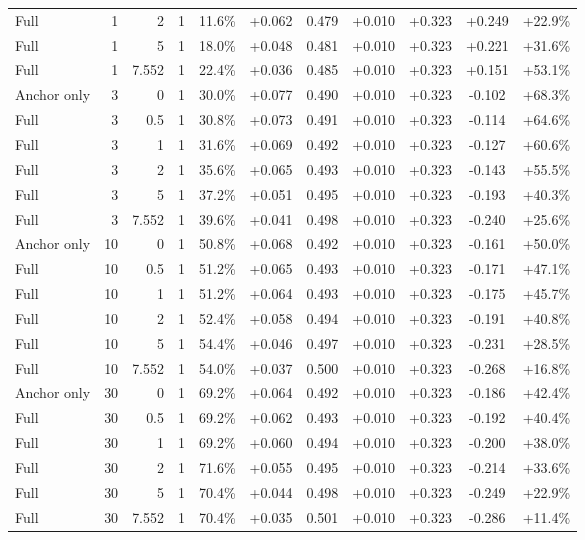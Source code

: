 \begin{table}[htbp]
\begin{tabular}{lrrrccccccc}
Full & 1 & 2 & 1 & 11.6\% & +0.062 & 0.479 & +0.010 & +0.323 & +0.249 & +22.9\% \\
Full & 1 & 5 & 1 & 18.0\% & +0.048 & 0.481 & +0.010 & +0.323 & +0.221 & +31.6\% \\
Full & 1 & 7.552 & 1 & 22.4\% & +0.036 & 0.485 & +0.010 & +0.323 & +0.151 & +53.1\% \\
Anchor only & 3 & 0 & 1 & 30.0\% & +0.077 & 0.490 & +0.010 & +0.323 & -0.102 & +68.3\% \\
Full & 3 & 0.5 & 1 & 30.8\% & +0.073 & 0.491 & +0.010 & +0.323 & -0.114 & +64.6\% \\
Full & 3 & 1 & 1 & 31.6\% & +0.069 & 0.492 & +0.010 & +0.323 & -0.127 & +60.6\% \\
Full & 3 & 2 & 1 & 35.6\% & +0.065 & 0.493 & +0.010 & +0.323 & -0.143 & +55.5\% \\
Full & 3 & 5 & 1 & 37.2\% & +0.051 & 0.495 & +0.010 & +0.323 & -0.193 & +40.3\% \\
Full & 3 & 7.552 & 1 & 39.6\% & +0.041 & 0.498 & +0.010 & +0.323 & -0.240 & +25.6\% \\
Anchor only & 10 & 0 & 1 & 50.8\% & +0.068 & 0.492 & +0.010 & +0.323 & -0.161 & +50.0\% \\
Full & 10 & 0.5 & 1 & 51.2\% & +0.065 & 0.493 & +0.010 & +0.323 & -0.171 & +47.1\% \\
Full & 10 & 1 & 1 & 51.2\% & +0.064 & 0.493 & +0.010 & +0.323 & -0.175 & +45.7\% \\
Full & 10 & 2 & 1 & 52.4\% & +0.058 & 0.494 & +0.010 & +0.323 & -0.191 & +40.8\% \\
Full & 10 & 5 & 1 & 54.4\% & +0.046 & 0.497 & +0.010 & +0.323 & -0.231 & +28.5\% \\
Full & 10 & 7.552 & 1 & 54.0\% & +0.037 & 0.500 & +0.010 & +0.323 & -0.268 & +16.8\% \\
Anchor only & 30 & 0 & 1 & 69.2\% & +0.064 & 0.492 & +0.010 & +0.323 & -0.186 & +42.4\% \\
Full & 30 & 0.5 & 1 & 69.2\% & +0.062 & 0.493 & +0.010 & +0.323 & -0.192 & +40.4\% \\
Full & 30 & 1 & 1 & 69.2\% & +0.060 & 0.494 & +0.010 & +0.323 & -0.200 & +38.0\% \\
Full & 30 & 2 & 1 & 71.6\% & +0.055 & 0.495 & +0.010 & +0.323 & -0.214 & +33.6\% \\
Full & 30 & 5 & 1 & 70.4\% & +0.044 & 0.498 & +0.010 & +0.323 & -0.249 & +22.9\% \\
Full & 30 & 7.552 & 1 & 70.4\% & +0.035 & 0.501 & +0.010 & +0.323 & -0.286 & +11.4\% \\

\end{tabular}
\end{table}

